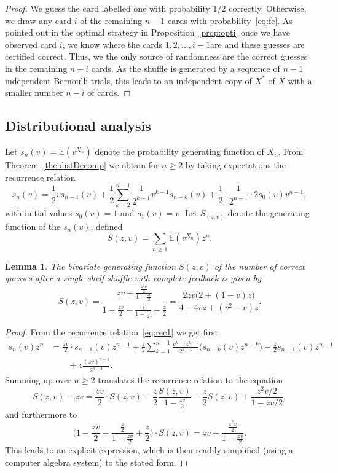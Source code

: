 \documentclass[10pt,reqno,a4paper]{amsart}
\newtheorem{lem}[theorem]{Lemma}
\theoremstyle{definition}
\def\E{{\mathbb {E}}}
\begin{document}
\begin{proof}
We guess the card labelled one with probability $1/2$ correctly. Otherwise, we draw any card $i$ of the remaining $n-1$ cards with probability~\eqref{eq:fc}.
As pointed out in the optimal strategy in Proposition~\ref{prop:opti} once we have observed card $i$, we know where the cards $1,2,\dots,i-1$are and these guesses are certified correct. Thus, we the only source of randomness are the correct guesses in the remaining $n-i$ cards.
As the shuffle is generated by a sequence of $n-1$ independent Bernoulli trials, this leads to an independent copy of $X^{\ast}$ of $X$ with a smaller number $n-i$ of cards. 
\end{proof}

\subsection{Distributional analysis}
Let $s_n(v)=\E(v^{X_n})$ denote the probability generating function of $X_n$. From Theorem~\ref{the:distDecomp} we obtain 
for $n\ge 2$ by taking expectations the recurrence relation
\begin{equation}
\label{eq:rec1}
s_n(v)=\frac12 v s_{n-1}(v)+\frac12\sum_{k=2}^{n-1}\frac1{2^{k-1}}v^{k-1}s_{n-k}(v) + \frac12\cdot \frac1{2^{n-1}}\cdot 2s_0(v)v^{n-1},
\end{equation}
with initial values $s_0(v)=1$ and $s_1(v)=v$. 
Let $S_(z,v)$ denote the generating function of the $s_n(v)$, defined 
\[
S(z,v)=\sum_{n\ge 1}\E(v^{X_n})z^n.
\]
\begin{lem}
\label{lem:gf}
The bivariate generating function $S(z,v)$ of the number of correct guesses after a single shelf shuffle with complete feedback is given by 
\[
S(z,v)=\frac{zv+\frac{\frac{z^2v}2}{1-\frac{zv}2}}{1-\frac{zv}2-\frac{\frac{z}2}{1-\frac{zv}2}+
\frac{z}2}=\frac{2zv\big(2+(1-v)z\big)}{4-4vz+(v^2-v)z}.
\]
\end{lem}
\begin{proof}
From the recurrence relation~\eqref{eq:rec1} we get first
\begin{equation}
\begin{split}
s_n(v)z^n&=\frac{zv}2\cdot s_{n-1}(v)z^{n-1}+\frac{z}2\sum_{k=1}^{n-1}\frac{v^{k-1}z^{k-1}}{2^{k-1}}\big(s_{n-k}(v)z^{n-k}\big)
-\frac{z}2s_{n-1}(v)z^{n-1}\\
&\qquad  + z\frac{(zv)^{n-1}}{2^{n-1}}.
\end{split}
\end{equation}
Summing up over $n\ge 2$ translates the recurrence relation to the equation
\[
S(z,v)-zv=\frac{zv}2\cdot S(z,v)+\frac{z}2 \frac{S(z,v)}{1-\frac{zv}2}-\frac{z}2 S(z,v)+\frac{z^2v/2}{1-zv/2},
\]
and furthermore to
\[
\Big(1-\frac{zv}2-\frac{\frac{z}2}{1-\frac{zv}2}+\frac{z}2\Big)\cdot S(z,v)=zv+\frac{\frac{z^2v}2}{1-\frac{zv}2}.
\]
This leads to an explicit expression, which is then readily simplified (using a computer algebra system) to the stated form.
\end{proof}
\end{document}
